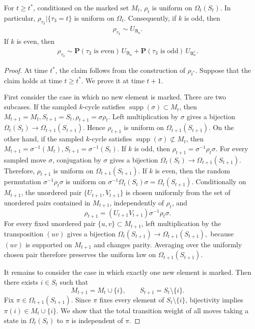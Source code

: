 \begin{lemma}\label{lem:uniform}
    For $t \geq t^*$, conditioned on the marked set $M_t$, $\rho_t$ is uniform on $\Omega_{t}(S_t)$. In particular, $\rho_{\tau_3}|\{\tau_3= t\}$ is uniform on $\Omega_t$. Consequently, if $k$ is odd, then
    \begin{align*}
        \rho_{\tau_3}\sim U_{\mathfrak{A}_n}.
    \end{align*}
    If $k$ is even, then
\begin{align*}
    \rho_{\tau_3}\sim \mathbf{P}(\tau_3\text{ is even}) \, U_{\mathfrak{A}_n}+\mathbf{P}(\tau_3\text{ is odd}) \, U_{\mathfrak{A}_n^c}.
\end{align*}
\end{lemma}
\begin{proof}
    At time $t^*$, the claim follows from the construction of $\rho_{t^*}$. Suppose that the claim holds at time $t\geq t^*$. We prove it at time $t+1$. 


First consider the case in which no new element is marked. There are two subcases. If the sampled $k$-cycle satisfies $\operatorname{supp}(\sigma)\subset M_t$, then $M_{t+1} = M_t, S_{t+1}= S_t,\rho_{t+1}= \sigma\rho_t$. Left multiplication by $\sigma$ gives a bijection $\Omega_t(S_t)\longrightarrow \Omega_{t+1}(S_{t+1})$. Hence $\rho_{t+1}$ is uniform on $\Omega_{t+1}(S_{t+1})$. On the other hand, if the sampled $k$-cycle satisfies $\operatorname{supp}(\sigma)\not\subset M_t$, then $M_{t+1} = \sigma^{-1}(M_t), S_{t+1}= \sigma^{-1}(S_t)$. If $k$ is odd, then $\rho_{t+1}= \sigma^{-1}\rho_t\sigma$. For every sampled move $\sigma$, conjugation by $\sigma$ gives a bijection $\Omega_{t}(S_t)\rightarrow \Omega_{t+1}(S_{t+1})$. Therefore, $\rho_{t+1}$ is uniform on $\Omega_{t+1}(S_{t+1})$. If $k$ is even, then the random permutation
$
\sigma^{-1}\rho_t\sigma
$
is uniform on
$
\sigma^{-1}\Omega_t(S_t)\sigma=\Omega_t(S_{t+1}).
$ Conditionally on $M_{t+1}$, the unordered pair
$
\{U_{t+1},V_{t+1}\}
$
is chosen uniformly from the set of unordered pairs contained in $M_{t+1}$, independently of
$\rho_t$, and
\[
\rho_{t+1}=(U_{t+1}V_{t+1})\sigma^{-1}\rho_t\sigma.
\]
For every fixed unordered pair $\{u,v\}\subset M_{t+1}$, left multiplication by the transposition
$(uv)$ gives a bijection
$
\Omega_t(S_{t+1})\longrightarrow \Omega_{t+1}(S_{t+1}),
$
because $(uv)$ is supported on $M_{t+1}$ and changes parity. Averaging over the uniformly
chosen pair therefore preserves the uniform law on $\Omega_{t+1}(S_{t+1})$.


It remains to consider the case in which exactly one new element is marked. Then there exists
$i\in S_t$ such that
\[
M_{t+1}=M_t\cup\{i\},\qquad S_{t+1}=S_t\setminus\{i\}.
\]
Fix $\pi\in \Omega_{t+1}(S_{t+1})$. Since $\pi$ fixes every element of
$S_t\setminus\{i\}$, bijectivity implies $\pi(i)\in M_t\cup\{i\}$. 
We show
that the total transition weight of all moves taking a state in
$\Omega_t(S_t)$ to $\pi$ is independent of $\pi$.


\end{proof}
